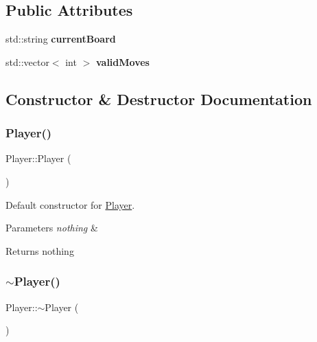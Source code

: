\subsection*{Public Attributes}
\begin{DoxyCompactItemize}
\item 
\mbox{\label{classPlayer_ad0068d87dfc2815e83095346c2818861}} 
std\+::string {\bfseries current\+Board}
\item 
\mbox{\label{classPlayer_a03462bb888096d385a2fe41f1d55669d}} 
std\+::vector$<$ int $>$ {\bfseries valid\+Moves}
\end{DoxyCompactItemize}


\subsection{Constructor \& Destructor Documentation}
\mbox{\label{classPlayer_affe0cc3cb714f6deb4e62f0c0d3f1fd8}} 
\subsubsection{\texorpdfstring{Player()}{Player()}}
{\footnotesize\ttfamily Player\+::\+Player (\begin{DoxyParamCaption}{ }\end{DoxyParamCaption})}



Default constructor for \mbox{\hyperlink{classPlayer}{Player}}. 


\begin{DoxyParams}{Parameters}
{\em nothing} & \\
\hline
\end{DoxyParams}
\begin{DoxyReturn}{Returns}
nothing 
\end{DoxyReturn}
\mbox{\label{classPlayer_a749d2c00e1fe0f5c2746f7505a58c062}} 
\subsubsection{\texorpdfstring{$\sim$\+Player()}{~Player()}}
{\footnotesize\ttfamily Player\+::$\sim$\+Player (\begin{DoxyParamCaption}{ }\end{DoxyParamCaption})\hspace{0.3cm}{\ttfamily [virtual]}}



